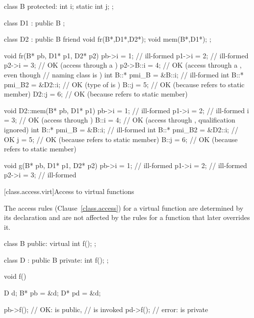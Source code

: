 \begin{codeblock}
class B {
protected:
  int i;
  static int j;
};

class D1 : public B {
};

class D2 : public B {
  friend void fr(B*,D1*,D2*);
  void mem(B*,D1*);
};

void fr(B* pb, D1* p1, D2* p2) {
  pb->i = 1;                    // ill-formed
  p1->i = 2;                    // ill-formed
  p2->i = 3;                    // OK (access through a )
  p2->B::i = 4;                 // OK (access through a , even though
                                // naming class is )
  int B::* pmi_B = &B::i;       // ill-formed
  int B::* pmi_B2 = &D2::i;     // OK (type of  is )
  B::j = 5;                     // OK (because refers to static member)
  D2::j = 6;                    // OK (because refers to static member)
}

void D2::mem(B* pb, D1* p1) {
  pb->i = 1;                    // ill-formed
  p1->i = 2;                    // ill-formed
  i = 3;                        // OK (access through )
  B::i = 4;                     // OK (access through , qualification ignored)
  int B::* pmi_B = &B::i;       // ill-formed
  int B::* pmi_B2 = &D2::i;     // OK
  j = 5;                        // OK (because  refers to static member)
  B::j = 6;                     // OK (because  refers to static member)
}

void g(B* pb, D1* p1, D2* p2) {
  pb->i = 1;                    // ill-formed
  p1->i = 2;                    // ill-formed
  p2->i = 3;                    // ill-formed
}
\end{codeblock}
\exitexample

[class.access.virt]{Access to virtual functions}%

\pnum
The access rules (Clause~\ref{class.access}) for a virtual function are determined by its declaration
and are not affected by the rules for a function that later overrides it.
\enterexample

\begin{codeblock}
class B {
public:
  virtual int f();
};

class D : public B {
private:
  int f();
};

void f() {
  D d;
  B* pb = &d;
  D* pd = &d;

  pb->f();                      // OK:  is public,
                                //  is invoked
  pd->f();                      // error:  is private
}
\end{codeblock}
\exitexample

